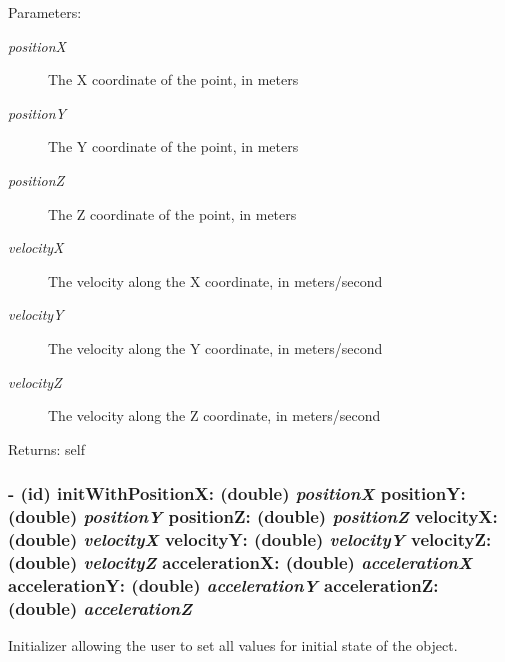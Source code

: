 \begin{Desc}
\item[Parameters:]
\begin{description}
\item[{\em positionX}]The X coordinate of the point, in meters \item[{\em positionY}]The Y coordinate of the point, in meters \item[{\em positionZ}]The Z coordinate of the point, in meters \item[{\em velocityX}]The velocity along the X coordinate, in meters/second \item[{\em velocityY}]The velocity along the Y coordinate, in meters/second \item[{\em velocityZ}]The velocity along the Z coordinate, in meters/second\end{description}
\end{Desc}
\begin{Desc}
\item[Returns:]self \end{Desc}
\hypertarget{interface_i_m_s_r_point_object_0251ecd091ae3e8a0840a6b6ab35be0b}{
\subsubsection[{initWithPositionX:positionY:positionZ:velocityX:velocityY:velocityZ:accelerationX:accelerationY:accelerationZ:}]{\setlength{\rightskip}{0pt plus 5cm}- (id) initWithPositionX: (double) {\em positionX}\/ positionY: (double) {\em positionY}\/ positionZ: (double) {\em positionZ}\/ velocityX: (double) {\em velocityX}\/ velocityY: (double) {\em velocityY}\/ velocityZ: (double) {\em velocityZ}\/ accelerationX: (double) {\em accelerationX}\/ accelerationY: (double) {\em accelerationY}\/ accelerationZ: (double) {\em accelerationZ}}}
\label{interface_i_m_s_r_point_object_0251ecd091ae3e8a0840a6b6ab35be0b}


Initializer allowing the user to set all values for initial state of the object. 

